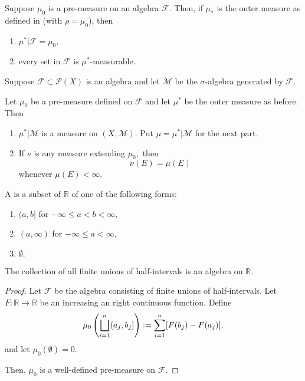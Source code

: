 \documentclass[12pt]{article}	%
\begin{document}
\begin{prop}
	Suppose $\mu_0$ is a pre-measure on an algebra $\mathcal{F}.$ Then, if $\mu_*$ is the outer measure as defined in  (with $\rho = \mu_0$), then
	\begin{enumerate}
		\item $\mu^*|\mathcal{F} = \mu_0,$
		\item every set in $\mathcal{F}$ is $\mu^*$-measurable.
	\end{enumerate}
\end{prop}

\begin{thm}
	Suppose $\mathcal{F} \subset \mathcal{P}(X)$ is an algebra and let $\mathcal{M}$ be the $\sigma$-algebra generated by $\mathcal{F}.$

	Let $\mu_0$ be a pre-measure defined on $\mathcal{F}$ and let $\mu^*$ be the outer measure as before. Then
	\begin{enumerate}
		\item $\mu^*|\mathcal{M}$ is a measure on $(X, \mathcal{M}).$ Put $\mu = \mu^*|\mathcal{M}$ for the next part.
		\item If $\nu$ is any measure extending $\mu_0,$ then
		\begin{equation*} 
			\nu(E) = \mu(E)
		\end{equation*}
		whenever $\mu(E) < \infty.$
	\end{enumerate}
\end{thm}

\begin{defn}
	A  is a subset of $\mathbb{R}$ of one of the following forms:
	\begin{enumerate}
		\item $(a, b]$ for $-\infty \le a < b < \infty,$ 
		\item $(a, \infty)$ for $-\infty \le a < \infty,$
		\item $\emptyset.$
	\end{enumerate}
\end{defn}

\begin{prop}
	The collection of all finite unions of half-intervals is an algebra on $\mathbb{R}.$
\end{prop}

\begin{proof} 
	Let $\mathcal{F}$ be the algebra consisting of finite unions of half-intervals. Let $F : \mathbb{R} \to \mathbb{R}$ be an increasing an right continuous function. Define
	\begin{equation*} 
		\mu_0\left(\bigsqcup_{i = 1}^n (a_j, b_j]\right) \vcentcolon= \sum_{i = 1}^{n} [F(b_j) - F(a_j)],
	\end{equation*}
	and let $\mu_0(\emptyset) = 0.$
	
	Then, $\mu_0$ is a well-defined pre-measure on $\mathcal{F}.$
\end{proof}
\end{document}
